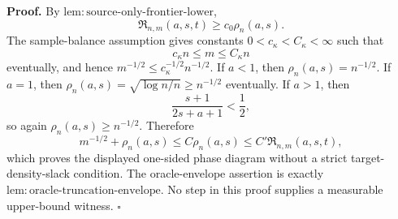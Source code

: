 \textbf{Proof.}
By \(\mathrm{lem:source\text{-}only\text{-}frontier\text{-}lower}\),
\[
\mathfrak R_{n,m}(a,s,t)\ge c_0\rho_n(a,s).
\]
The sample-balance assumption gives constants \(0<c_\kappa<C_\kappa<\infty\) such that
\[
c_\kappa n\le m\le C_\kappa n
\]
eventually, and hence \(m^{-1/2}\le c_\kappa^{-1/2}n^{-1/2}\). If \(a<1\), then \(\rho_n(a,s)=n^{-1/2}\). If \(a=1\), then \(\rho_n(a,s)=\sqrt{\log n/n}\ge n^{-1/2}\) eventually. If \(a>1\), then
\[
\frac{s+1}{2s+a+1}<\frac12,
\]
so again \(\rho_n(a,s)\ge n^{-1/2}\). Therefore
\[
m^{-1/2}+\rho_n(a,s)\le C\rho_n(a,s)
\le C'\mathfrak R_{n,m}(a,s,t),
\]
which proves the displayed one-sided phase diagram without a strict target-density-slack condition. The oracle-envelope assertion is exactly \(\mathrm{lem:oracle\text{-}truncation\text{-}envelope}\). No step in this proof supplies a measurable upper-bound witness. \(\square\)